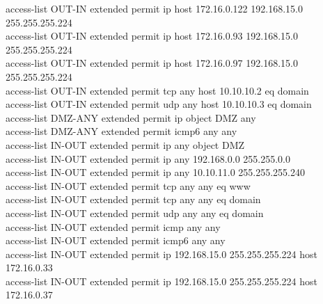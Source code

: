 \documentclass[12pt,a4paper]{report}
\begin{document}
{\hspace*{1cm}access-list OUT-IN extended permit ip host 172.16.0.122 192.168.15.0 255.255.255.224\\
\hspace*{1cm}access-list OUT-IN extended permit ip host 172.16.0.93 192.168.15.0 255.255.255.224\\
\hspace*{1cm}access-list OUT-IN extended permit ip host 172.16.0.97 192.168.15.0 255.255.255.224\\
\hspace*{1cm}access-list OUT-IN extended permit tcp any host 10.10.10.2 eq domain\\
\hspace*{1cm}access-list OUT-IN extended permit udp any host 10.10.10.3 eq domain \\
\hspace*{1cm}access-list DMZ-ANY extended permit ip object DMZ any\\
\hspace*{1cm}access-list DMZ-ANY extended permit icmp6 any any \\
\hspace*{1cm}access-list IN-OUT extended permit ip any object DMZ\\
\hspace*{1cm}access-list IN-OUT extended permit ip any 192.168.0.0 255.255.0.0 \\
\hspace*{1cm}access-list IN-OUT extended permit ip any 10.10.11.0 255.255.255.240 \\
\hspace*{1cm}access-list IN-OUT extended permit tcp any any eq www\\
\hspace*{1cm}access-list IN-OUT extended permit tcp any any eq domain \\
\hspace*{1cm}access-list IN-OUT extended permit udp any any eq domain \\
\hspace*{1cm}access-list IN-OUT extended permit icmp any any\\
\hspace*{1cm}access-list IN-OUT extended permit icmp6 any any\\
\hspace*{1cm}access-list IN-OUT extended permit ip 192.168.15.0 255.255.255.224 host 172.16.0.33\\
\hspace*{1cm}access-list IN-OUT extended permit ip 192.168.15.0 255.255.255.224 host 172.16.0.37\\
}
\end{document}
